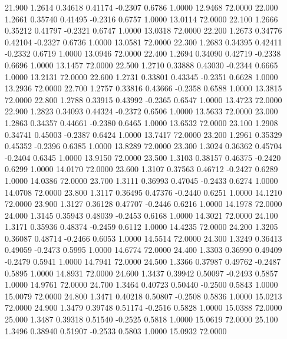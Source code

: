   21.900   1.2614   0.34618   0.41174  -0.2307   0.6786   1.0000  12.9468  72.0000
  22.000   1.2661   0.35740   0.41495  -0.2316   0.6757   1.0000  13.0114  72.0000
  22.100   1.2666   0.35212   0.41797  -0.2321   0.6747   1.0000  13.0318  72.0000
  22.200   1.2673   0.34776   0.42104  -0.2327   0.6736   1.0000  13.0581  72.0000
  22.300   1.2683   0.34395   0.42411  -0.2332   0.6719   1.0000  13.0946  72.0000
  22.400   1.2694   0.34090   0.42719  -0.2338   0.6696   1.0000  13.1457  72.0000
  22.500   1.2710   0.33888   0.43030  -0.2344   0.6665   1.0000  13.2131  72.0000
  22.600   1.2731   0.33801   0.43345  -0.2351   0.6628   1.0000  13.2936  72.0000
  22.700   1.2757   0.33816   0.43666  -0.2358   0.6588   1.0000  13.3815  72.0000
  22.800   1.2788   0.33915   0.43992  -0.2365   0.6547   1.0000  13.4723  72.0000
  22.900   1.2823   0.34093   0.44324  -0.2372   0.6506   1.0000  13.5633  72.0000
  23.000   1.2863   0.34357   0.44661  -0.2380   0.6465   1.0000  13.6532  72.0000
  23.100   1.2908   0.34741   0.45003  -0.2387   0.6424   1.0000  13.7417  72.0000
  23.200   1.2961   0.35329   0.45352  -0.2396   0.6385   1.0000  13.8289  72.0000
  23.300   1.3024   0.36362   0.45704  -0.2404   0.6345   1.0000  13.9150  72.0000
  23.500   1.3103   0.38157   0.46375  -0.2420   0.6299   1.0000  14.0170  72.0000
  23.600   1.3107   0.37563   0.46712  -0.2427   0.6289   1.0000  14.0386  72.0000
  23.700   1.3111   0.36993   0.47045  -0.2433   0.6274   1.0000  14.0708  72.0000
  23.800   1.3117   0.36495   0.47376  -0.2440   0.6251   1.0000  14.1210  72.0000
  23.900   1.3127   0.36128   0.47707  -0.2446   0.6216   1.0000  14.1978  72.0000
  24.000   1.3145   0.35943   0.48039  -0.2453   0.6168   1.0000  14.3021  72.0000
  24.100   1.3171   0.35936   0.48374  -0.2459   0.6112   1.0000  14.4235  72.0000
  24.200   1.3205   0.36087   0.48714  -0.2466   0.6053   1.0000  14.5514  72.0000
  24.300   1.3249   0.36413   0.49059  -0.2473   0.5995   1.0000  14.6774  72.0000
  24.400   1.3303   0.36990   0.49409  -0.2479   0.5941   1.0000  14.7941  72.0000
  24.500   1.3366   0.37987   0.49762  -0.2487   0.5895   1.0000  14.8931  72.0000
  24.600   1.3437   0.39942   0.50097  -0.2493   0.5857   1.0000  14.9761  72.0000
  24.700   1.3464   0.40723   0.50440  -0.2500   0.5843   1.0000  15.0079  72.0000
  24.800   1.3471   0.40218   0.50807  -0.2508   0.5836   1.0000  15.0213  72.0000
  24.900   1.3479   0.39748   0.51174  -0.2516   0.5828   1.0000  15.0388  72.0000
  25.000   1.3487   0.39318   0.51540  -0.2525   0.5818   1.0000  15.0619  72.0000
  25.100   1.3496   0.38940   0.51907  -0.2533   0.5803   1.0000  15.0932  72.0000
